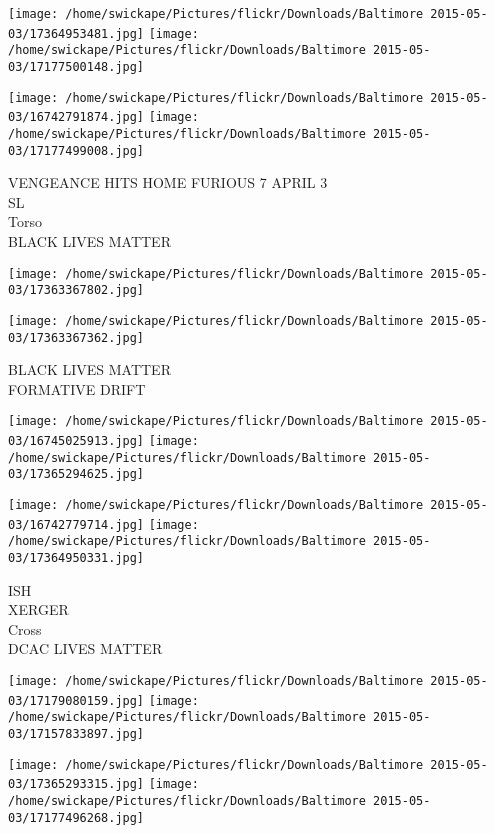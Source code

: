 \documentclass[10pt,letterpaper]{article}
\begin{document}
\texttt{[image: /home/swickape/Pictures/flickr/Downloads/Baltimore 2015-05-03/17364953481.jpg]}
\texttt{[image: /home/swickape/Pictures/flickr/Downloads/Baltimore 2015-05-03/17177500148.jpg]}

\texttt{[image: /home/swickape/Pictures/flickr/Downloads/Baltimore 2015-05-03/16742791874.jpg]}
\texttt{[image: /home/swickape/Pictures/flickr/Downloads/Baltimore 2015-05-03/17177499008.jpg]}

VENGEANCE HITS HOME FURIOUS 7 APRIL 3\\
SL\\
Torso\\
BLACK LIVES MATTER\\
\pagebreak

\texttt{[image: /home/swickape/Pictures/flickr/Downloads/Baltimore 2015-05-03/17363367802.jpg]}

\vspace{0.25in}
\texttt{[image: /home/swickape/Pictures/flickr/Downloads/Baltimore 2015-05-03/17363367362.jpg]}

BLACK LIVES MATTER\\
FORMATIVE DRIFT\\
\pagebreak

\texttt{[image: /home/swickape/Pictures/flickr/Downloads/Baltimore 2015-05-03/16745025913.jpg]}
\texttt{[image: /home/swickape/Pictures/flickr/Downloads/Baltimore 2015-05-03/17365294625.jpg]}

\texttt{[image: /home/swickape/Pictures/flickr/Downloads/Baltimore 2015-05-03/16742779714.jpg]}
\texttt{[image: /home/swickape/Pictures/flickr/Downloads/Baltimore 2015-05-03/17364950331.jpg]}

ISH\\
XERGER\\
Cross\\
DCAC LIVES MATTER\\
\pagebreak

\texttt{[image: /home/swickape/Pictures/flickr/Downloads/Baltimore 2015-05-03/17179080159.jpg]}
\texttt{[image: /home/swickape/Pictures/flickr/Downloads/Baltimore 2015-05-03/17157833897.jpg]}

\texttt{[image: /home/swickape/Pictures/flickr/Downloads/Baltimore 2015-05-03/17365293315.jpg]}
\texttt{[image: /home/swickape/Pictures/flickr/Downloads/Baltimore 2015-05-03/17177496268.jpg]}
\end{document}
